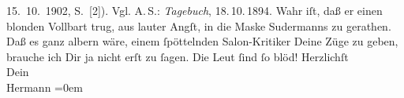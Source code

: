 \begin{ledgroupsized}[t]{13cm}
{{{                        15. 10. 1902, S. [2]). Vgl. A. S.: \emph{Tagebuch}, 18. 10. 1894}}}\label{K_L01242_2h}. Wahr iſt, daß er einen blonden Vollbart trug, aus lauter Angſt, in die Maske
                  Sudermanns zu gerathen. Daß es ganz albern
               wäre, einem ſpöttelnden Salon-Kritiker Deine Züge zu geben, brauche ich Dir ja nicht
               erſt zu ſagen. Die Leut ſind ſo blöd!\pend
           \pstart
           Herzlichſt{\\[\baselineskip]}Dein{\\[\baselineskip]}\spacefill\mbox{Hermann}\pend
           \leftskip=0em{}
         
         \endnumbering{}\end{ledgroupsized}  \newcommand{\dateiname}{L01242}\newcommand{\titel}{Hermann Bahr an Arthur Schnitzler, 15. 10. 1902}\newcommand{\editorInnen}{ Kurt Ifkovits,  Martin Anton Müller}
      